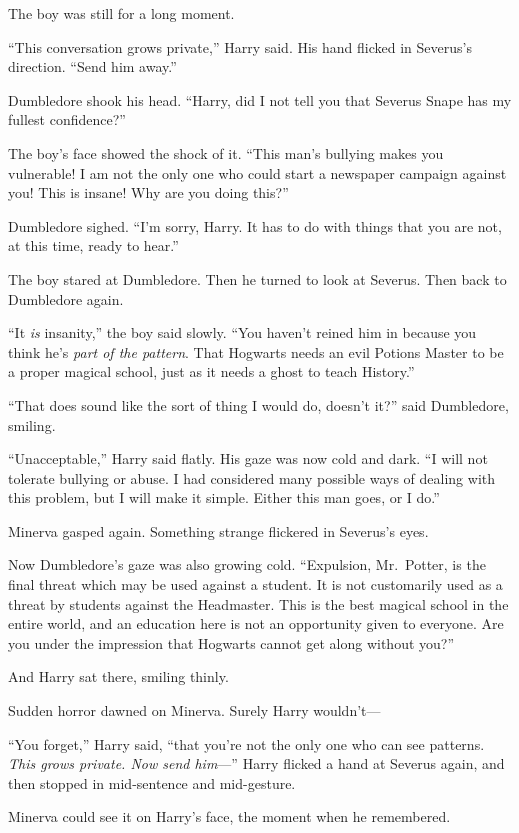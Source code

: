 The boy was still for a long moment.

``This conversation grows private,'' Harry said. His hand flicked in
Severus's direction. ``Send him away.''

Dumbledore shook his head. ``Harry, did I not tell you that Severus
Snape has my fullest confidence?''

The boy's face showed the shock of it. ``This man's bullying makes you
vulnerable! I am not the only one who could start a newspaper campaign
against you! This is insane! Why are you doing this?''

Dumbledore sighed. ``I'm sorry, Harry. It has to do with things that you
are not, at this time, ready to hear.''

The boy stared at Dumbledore. Then he turned to look at Severus. Then
back to Dumbledore again.

``It \emph{is} insanity,'' the boy said slowly. ``You haven't reined him
in because you think he's \emph{part of the pattern}. That Hogwarts
needs an evil Potions Master to be a proper magical school, just as it
needs a ghost to teach History.''

``That does sound like the sort of thing I would do, doesn't it?'' said
Dumbledore, smiling.

``Unacceptable,'' Harry said flatly. His gaze was now cold and dark. ``I
will not tolerate bullying or abuse. I had considered many possible ways
of dealing with this problem, but I will make it simple. Either this man
goes, or I do.''

Minerva gasped again. Something strange flickered in Severus's eyes.

Now Dumbledore's gaze was also growing cold. ``Expulsion, Mr.~Potter, is
the final threat which may be used against a student. It is not
customarily used as a threat by students against the Headmaster. This is
the best magical school in the entire world, and an education here is
not an opportunity given to everyone. Are you under the impression that
Hogwarts cannot get along without you?''

And Harry sat there, smiling thinly.

Sudden horror dawned on Minerva. Surely Harry wouldn't---

``You forget,'' Harry said, ``that you're not the only one who can see
patterns. \emph{This grows private. Now send him}---'' Harry flicked a
hand at Severus again, and then stopped in mid-sentence and mid-gesture.

Minerva could see it on Harry's face, the moment when he remembered.

